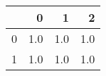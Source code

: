 \begin{tabular}{lrrr}
\toprule
{} &    0 &    1 &    2 \\
\midrule
0 &  1.0 &  1.0 &  1.0 \\
1 &  1.0 &  1.0 &  1.0 \\
\bottomrule
\end{tabular}
